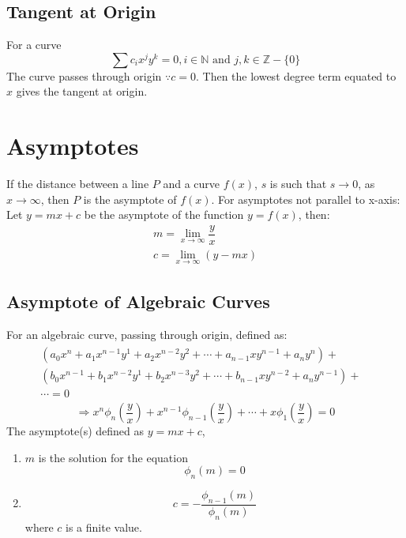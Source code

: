 \subsection{Tangent at Origin}
For a curve
\begin{equation}
	\sum c_i x^j y^k=0, i\in\mathbb{N}\text{ and }j,k\in\mathbb{Z}-\lbrace 0 \rbrace
\end{equation}
The curve passes through origin $\because c=0$. Then the lowest degree term equated to $x$ gives the tangent at origin.


\section{Asymptotes}
If the distance between a line $P$ and a curve $f(x)$, $s$ is such that $s\to0$, as $x\to\infty$, then $P$ is the asymptote of $f(x)$. For asymptotes not parallel to x-axis:\newline
Let $y=mx+c$ be the asymptote of the function $y=f(x)$, then:
\begin{align}
	m=\lim_{x\to\infty} \dfrac{y}{x}\\
	c=\lim_{x\to\infty} (y-mx)
\end{align}

\subsection{Asymptote of Algebraic Curves}
For an algebraic curve, passing through origin, defined as:
\begin{equation}
	\begin{aligned}
		\begin{split}
			(a_0x^n+a_1x^{n-1}y^1+a_2x^{n-2}y^2+\cdots+a_{n-1}xy^{n-1}+a_n y^n)+&\\
			(b_0x^{n-1}+b_1x^{n-2}y^1+b_2x^{n-3}y^2+\cdots+b_{n-1}xy^{n-2}+a_n y^{n-1})+&\\
			\cdots=0\nonumber
		\end{split}
	\end{aligned}
\end{equation}
\begin{equation}
	\Rightarrow x^n\phi_n\left(\dfrac{y}{x}\right)+x^{n-1}\phi_{n-1}\left(\dfrac{y}{x}\right)+\cdots+x\phi_1\left(\dfrac{y}{x}\right)=0\nonumber
\end{equation}
The asymptote(s) defined as $y=mx+c$,
\begin{enumerate}
	\item $m$ is the solution for the equation
	\begin{equation}
		\phi_n(m)=0
	\end{equation}
	\item \begin{equation}
		c=-\dfrac{\phi_{n-1}(m)}{\phi_n (m)}
	\end{equation}
	where $c$ is a finite value.
\end{enumerate}
